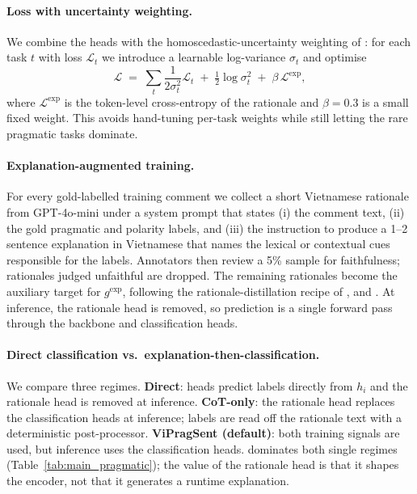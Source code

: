 \paragraph{Loss with uncertainty weighting.}
We combine the heads with the homoscedastic-uncertainty weighting of
\citet{kendall2018uncertainty}: for each task $t$ with loss
$\mathcal{L}_t$ we introduce a learnable log-variance $\sigma_t$ and
optimise
\[
\mathcal{L} \;=\; \sum_t \frac{1}{2\sigma_t^2}\mathcal{L}_t
              \;+\; \tfrac{1}{2}\log\sigma_t^2 \;+\;
              \beta\,\mathcal{L}^{\text{exp}},
\]
where $\mathcal{L}^{\text{exp}}$ is the token-level cross-entropy of
the rationale and $\beta{=}0.3$ is a small fixed weight. This avoids
hand-tuning per-task weights while still letting the rare pragmatic
tasks dominate.

\paragraph{Explanation-augmented training.}
For every gold-labelled training comment we collect a short
Vietnamese rationale from GPT-4o-mini under a system prompt that
states (i) the comment text, (ii) the gold pragmatic and polarity
labels, and (iii) the instruction to produce a 1--2 sentence
explanation in Vietnamese that names the lexical or contextual cues
responsible for the labels. Annotators then review a 5\% sample for
faithfulness; rationales judged unfaithful are dropped. The
remaining rationales become the auxiliary target for $g^{\text{exp}}$,
following the rationale-distillation recipe of
\citet{hsieh2023distillstep}, \citet{magister2023teaching} and
\citet{shridhar2023distillingcot}. At inference, the rationale head
is removed, so prediction is a single forward pass through the
backbone and classification heads.

\paragraph{Direct classification vs.\ explanation-then-classification.}
We compare three regimes. \textbf{Direct}: heads predict labels
directly from $h_i$ and the rationale head is removed at inference.
\textbf{CoT-only}: the rationale head replaces the classification
heads at inference; labels are read off the rationale text with a
deterministic post-processor. \textbf{ViPragSent (default)}: both
training signals are used, but inference uses the classification
heads. \method{} dominates both single regimes
(Table~\ref{tab:main_pragmatic}); the value of the rationale head is
that it shapes the encoder, not that it generates a runtime
explanation.

